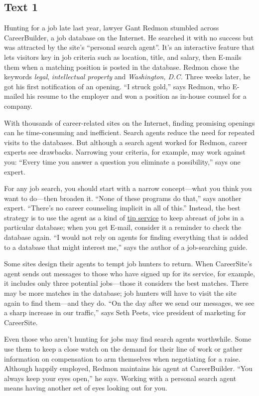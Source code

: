 \newpage
\subsection{Text 1}


Hunting for a job late last year, lawyer Gant Redmon stumbled across
CareerBuilder, a job database on the Internet. He searched it with no
success but was attracted by the site's ``personal search agent''. It's
an interactive feature that lets visitors key in job criteria such as
location, title, and salary, then E-mails them when a matching position
is posted in the database. Redmon chose the keywords \emph{legal},
	\emph{intellectual property} and \emph{Washington, D.C.} Three weeks later, he
got his first notification of an opening. ``I struck gold,'' says
Redmon, who E-mailed his resume to the employer and won a position as
in-house counsel for a company.

With thousands of career-related sites on the Internet, finding
promising openings can he time-consuming and inefficient. Search agents
reduce the need for repeated visits to the databases. But although a
search agent worked for Redmon, career experts see drawbacks. Narrowing
your criteria, for example, may work against you: ``Every time you
answer a question you eliminate a possibility,'' says one expert.

For any job search, you should start with a narrow concept---what you
think you want to do---then broaden it. ``None of these programs do
that,'' says another expert. ``There's no career counseling implicit in
all of this.'' Instead, the best strategy is to use the agent as a kind
of \uline{tip service} to keep abreast of jobs in a particular
database; when you get E-mail, consider it a reminder to check the
database again. ``I would not rely on agents for finding everything that
is added to a database that might interest me,'' says the author of a
job-searching guide.

Some sites design their agents to tempt job hunters to return. When
CareerSite's agent sends out messages to those who have signed up for
its service, for example, it includes only three potential jobs---those
it considers the best matches. There may be more matches in the
database; job hunters will have to visit the site again to find
them---and they do. ``On the day after we send our messages, we see a
sharp increase in our traffic,'' says Seth Peets, vice president of
marketing for CareerSite.

Even those who aren't hunting for jobs may find search agents
worthwhile. Some use them to keep a close watch on the demand for their
line of work or gather information on compensation to arm themselves
when negotiating for a raise. Although happily employed, Redmon
maintains his agent at CareerBuilder. ``You always keep your eyes
open,'' he says. Working with a personal search agent means having
another set of eyes looking out for you.


